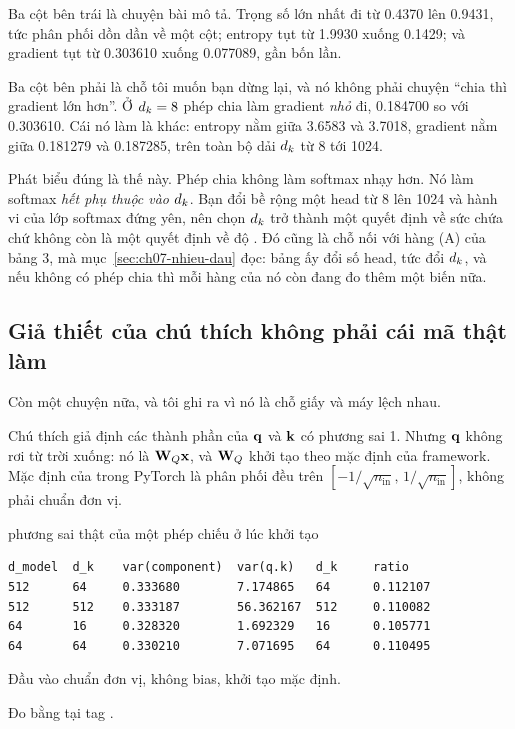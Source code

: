 %
Ba cột bên trái là chuyện bài mô tả. Trọng số lớn nhất đi từ 0.4370 lên 0.9431,
tức phân phối dồn dần về một cột; entropy tụt từ 1.9930 xuống 0.1429; và
gradient tụt từ 0.303610 xuống 0.077089, gần bốn lần.

Ba cột bên phải là chỗ tôi muốn bạn dừng lại, và nó không phải chuyện
\enquote{chia thì gradient lớn hơn}. Ở \(d_{k} = 8\) phép chia làm gradient
\emph{nhỏ} đi, 0.184700 so với 0.303610. Cái nó làm là khác: entropy nằm giữa
3.6583 và 3.7018, gradient nằm giữa 0.181279 và 0.187285, trên toàn bộ dải
\(d_{k}\) từ 8 tới 1024.

Phát biểu đúng là thế này. Phép chia không làm softmax nhạy hơn. Nó làm softmax
\emph{hết phụ thuộc vào \(d_{k}\)}. Bạn đổi bề rộng một head từ 8 lên 1024 và hành vi
của lớp softmax đứng yên, nên chọn \(d_{k}\) trở thành một quyết định về sức chứa
chứ không còn là một quyết định về độ . Đó cũng là chỗ
nối với hàng (A)
của bảng 3, mà mục~\ref{sec:ch07-nhieu-dau} đọc: bảng ấy đổi số head, tức đổi
\(d_{k}\), và nếu không có phép chia thì mỗi hàng của nó còn đang đo thêm một
biến nữa.

\subsection*{Giả thiết của chú thích không phải cái mã thật làm}

%
Còn một chuyện nữa, và tôi ghi ra vì nó là chỗ giấy và máy lệch nhau.

Chú thích giả định các thành phần của \(\mathbf{q}\) và \(\mathbf{k}\) có phương sai
1. Nhưng \(\mathbf{q}\) không rơi từ trời xuống: nó là \(\mathbf{W}_Q \mathbf{x}\), và
\(\mathbf{W}_Q\) khởi tạo theo mặc định của framework. Mặc định của
 trong PyTorch là phân phối đều trên
\([-1/\sqrt{n_{\mathrm{in}}},\, 1/\sqrt{n_{\mathrm{in}}}]\), không phải chuẩn
đơn vị.

\begin{measured}{phương sai thật của một phép chiếu ở lúc khởi tạo}
\begin{verbatim}
d_model  d_k    var(component)  var(q.k)   d_k     ratio
512      64     0.333680        7.174865   64      0.112107
512      512    0.333187        56.362167  512     0.110082
64       16     0.328320        1.692329   16      0.105771
64       64     0.330210        7.071695   64      0.110495
\end{verbatim}

Đầu vào chuẩn đơn vị,  không bias, khởi tạo mặc định.

Đo bằng  tại tag .
\end{measured}

